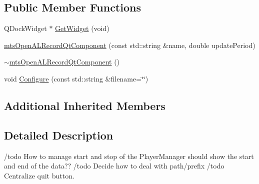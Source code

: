 \subsection*{Public Member Functions}
\begin{DoxyCompactItemize}
\item 
Q\-Dock\-Widget $\ast$ \hyperlink{classmts_open_a_l_record_qt_component_a8959b0029546b3471276899a1ef8d700}{Get\-Widget} (void)
\item 
\hyperlink{classmts_open_a_l_record_qt_component_a527dcc751b1db269bc5c03120a1289a4}{mts\-Open\-A\-L\-Record\-Qt\-Component} (const std\-::string \&name, double update\-Period)
\item 
\hyperlink{classmts_open_a_l_record_qt_component_a6222193309e2f6baaa569b5bd613609f}{$\sim$mts\-Open\-A\-L\-Record\-Qt\-Component} ()
\item 
void \hyperlink{classmts_open_a_l_record_qt_component_a94aa08224480eb442fa7d376489146b4}{Configure} (const std\-::string \&filename=\char`\"{}\char`\"{})
\end{DoxyCompactItemize}
\subsection*{Additional Inherited Members}


\subsection{Detailed Description}
/todo How to manage start and stop of the Player\-Manager should show the start and end of the data?? /todo Decide how to deal with path/prefix /todo Centralize quit button. 

